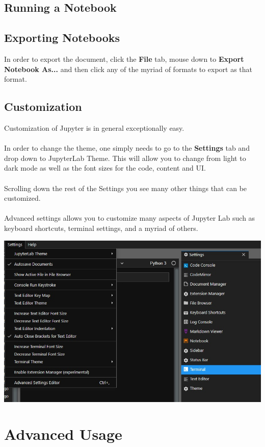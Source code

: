 \documentclass[pdftex,12pt]{artikel3}
\begin{document}
\subsection{Running a Notebook}

\subsection{Exporting Notebooks}
In order to export the document, click the \textbf{File} tab, mouse down to \textbf{Export Notebook As...} and then click any of the myriad of formats to export as that format. 

\subsection{Customization}
Customization of Jupyter is in general exceptionally easy.\\
\\
In order to change the theme, one simply needs to go to the \textbf{Settings} tab and drop down to JupyterLab Theme. This will allow you to change from light to dark mode as well as the font sizes for the code, content and UI.\\
\\
Scrolling down the rest of the Settings you see many other things that can be customized.\\
\\
Advanced settings allows you to customize many aspects of Jupyter Lab such as keyboard shortcuts, terminal settings, and a myriad of others.

\includegraphics[scale=.6]{Jupyter Settings.jpg}

\section{Advanced Usage}
\end{document}
